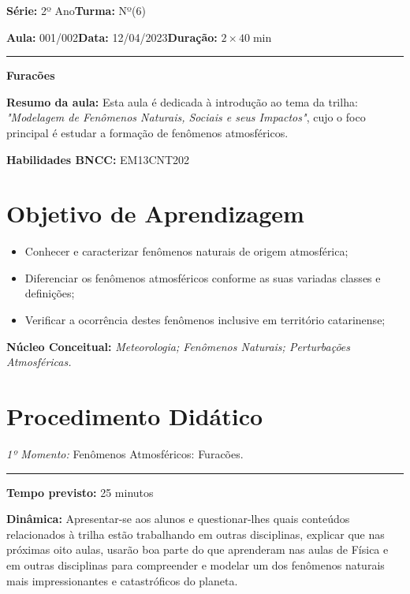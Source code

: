 \documentclass[
12pt,				%
openright,			%
oneside,			%
a4paper,			%
chapter=TITLE,		%
english,			%
brazil				%
]{abntex2}
\begin{document}
\par\noindent\textbf{Série:} 2º Ano\hfill{}\textbf{Turma:} Nº(6)
\par\noindent\textbf{Aula:} 001/002\hfill{}\textbf{Data:} 12/04/2023\hfill{}\textbf{Duração:} $2\times 40\min$
\rule{\textwidth}{.5pt}
\bigskip{}  
\noindent
\begin{center}
	\textbf{Furacões}
\end{center}
\par\noindent\textbf{Resumo da aula:} Esta aula é dedicada à introdução ao tema da trilha: \textit{"Modelagem de Fenômenos Naturais, Sociais e seus Impactos"}, cujo o foco principal é estudar a formação de fenômenos atmosféricos.
\par\noindent\textbf{Habilidades BNCC:} EM13CNT202

\section{Objetivo de Aprendizagem}
\begin{itemize}
	\item Conhecer e caracterizar fenômenos naturais de origem atmosférica;
	\item Diferenciar os fenômenos atmosféricos conforme as suas variadas classes e definições;
	\item Verificar a ocorrência destes fenômenos inclusive em território catarinense;
\end{itemize}

\medskip{}

\noindent\textbf{Núcleo Conceitual:} \emph{Meteorologia; Fenômenos Naturais; Perturbações Atmosféricas.}
\newpage

\section{Procedimento Didático} 
\noindent\emph{1º Momento:} Fenômenos Atmosféricos: Furacões.
\par\noindent\rule{.3\textwidth}{.5pt}  
\par\noindent\textbf{Tempo previsto:} 25 minutos

\noindent\textbf{Dinâmica:} Apresentar-se aos alunos e questionar-lhes quais conteúdos relacionados à trilha estão trabalhando em outras disciplinas, explicar que nas próximas oito aulas, usarão boa parte do que aprenderam nas aulas de Física e em outras disciplinas para compreender e modelar um dos fenômenos naturais mais impressionantes e catastróficos do planeta.
\end{document}
